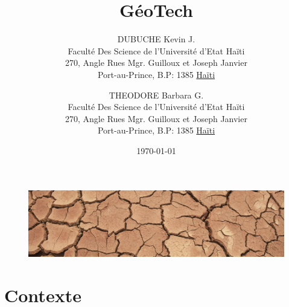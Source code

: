 \documentclass[a4paper,12pt]{report}
\begin{document}
\begin{figure}[t]
        \centering
        \includegraphics[width=2\textwidth]{image_fond}
        \label{image-GIS}
        \end{figure}

\title{GéoTech}
\author{
        DUBUCHE Kevin J. \\
        Faculté Des Science de l'Université d'Etat Haïti\\
        270, Angle Rues Mgr. Guilloux et Joseph Janvier\\
        Port-au-Prince, B.P: 1385 \underline{Haïti}
        \and
        THEODORE Barbara G.\\
        Faculté Des Science de l'Université d'Etat Haïti\\
        270, Angle Rues Mgr. Guilloux et Joseph Janvier \\
        Port-au-Prince, B.P: 1385  \underline{Haïti}
}
\date{\today}
\maketitle

\tableofcontents
\newpage
{}








\chapter{Contexte}


















\end{document}
